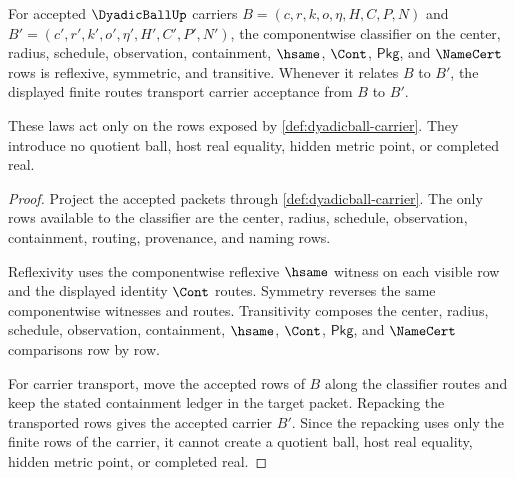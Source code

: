 \begin{theorem}
\label{thm:dyadicball-classifier-laws}
For accepted $\DyadicBallUp$ carriers
$B=(c,r,k,o,\eta,H,C,P,N)$ and
$B'=(c',r',k',o',\eta',H',C',P',N')$, the componentwise classifier on the
center, radius, schedule, observation, containment, $\hsame$, $\Cont$,
$\mathsf{Pkg}$, and $\NameCert$ rows is reflexive, symmetric, and transitive.
Whenever it relates $B$ to $B'$, the displayed finite routes transport carrier
acceptance from $B$ to $B'$.

These laws act only on the rows exposed by
\autoref{def:dyadicball-carrier}. They introduce no quotient ball, host real
equality, hidden metric point, or completed real.
\end{theorem}
\begin{proof}
Project the accepted packets through \autoref{def:dyadicball-carrier}. The
only rows available to the classifier are the center, radius, schedule,
observation, containment, routing, provenance, and naming rows.

Reflexivity uses the componentwise reflexive $\hsame$ witness on each visible
row and the displayed identity $\Cont$ routes. Symmetry reverses the same
componentwise witnesses and routes. Transitivity composes the center, radius,
schedule, observation, containment, $\hsame$, $\Cont$, $\mathsf{Pkg}$, and
$\NameCert$ comparisons row by row.

For carrier transport, move the accepted rows of $B$ along the classifier
routes and keep the stated containment ledger in the target packet. Repacking
the transported rows gives the accepted carrier $B'$. Since the repacking uses
only the finite rows of the carrier, it cannot create a quotient ball, host
real equality, hidden metric point, or completed real.
\end{proof}

